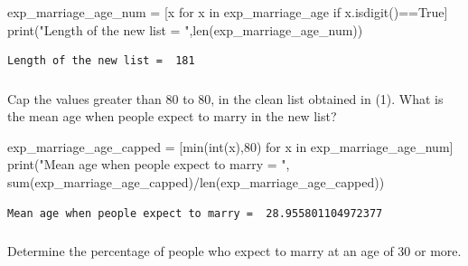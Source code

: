 \documentclass[
  letterpaper,
  DIV=11,
  numbers=noendperiod]{scrreprt}
\newenvironment{Shaded}{\begin{snugshade}}{\end{snugshade}}
\newcommand{\BuiltInTok}[1]{\textcolor[rgb]{0.00,0.23,0.31}{#1}}
\newcommand{\ControlFlowTok}[1]{\textcolor[rgb]{0.00,0.23,0.31}{#1}}
\newcommand{\DecValTok}[1]{\textcolor[rgb]{0.68,0.00,0.00}{#1}}
\newcommand{\KeywordTok}[1]{\textcolor[rgb]{0.00,0.23,0.31}{#1}}
\newcommand{\NormalTok}[1]{\textcolor[rgb]{0.00,0.23,0.31}{#1}}
\newcommand{\OperatorTok}[1]{\textcolor[rgb]{0.37,0.37,0.37}{#1}}
\newcommand{\StringTok}[1]{\textcolor[rgb]{0.13,0.47,0.30}{#1}}
\newcommand{\VariableTok}[1]{\textcolor[rgb]{0.07,0.07,0.07}{#1}}
\begin{document}
\begin{Shaded}
\begin{Highlighting}[]
\NormalTok{exp\_marriage\_age\_num }\OperatorTok{=}\NormalTok{ [x }\ControlFlowTok{for}\NormalTok{ x }\KeywordTok{in}\NormalTok{ exp\_marriage\_age }\ControlFlowTok{if}\NormalTok{ x.isdigit()}\OperatorTok{==}\VariableTok{True}\NormalTok{]}
\BuiltInTok{print}\NormalTok{(}\StringTok{"Length of the new list = "}\NormalTok{,}\BuiltInTok{len}\NormalTok{(exp\_marriage\_age\_num))}
\end{Highlighting}
\end{Shaded}

\begin{verbatim}
Length of the new list =  181
\end{verbatim}

\hypertarget{section-5}{%
\subsubsection{}\label{section-5}}

Cap the values greater than 80 to 80, in the clean list obtained in (1).
What is the mean age when people expect to marry in the new list?

\begin{Shaded}
\begin{Highlighting}[]
\NormalTok{exp\_marriage\_age\_capped }\OperatorTok{=}\NormalTok{ [}\BuiltInTok{min}\NormalTok{(}\BuiltInTok{int}\NormalTok{(x),}\DecValTok{80}\NormalTok{) }\ControlFlowTok{for}\NormalTok{ x }\KeywordTok{in}\NormalTok{ exp\_marriage\_age\_num]}
\BuiltInTok{print}\NormalTok{(}\StringTok{"Mean age when people expect to marry = "}\NormalTok{, }\BuiltInTok{sum}\NormalTok{(exp\_marriage\_age\_capped)}\OperatorTok{/}\BuiltInTok{len}\NormalTok{(exp\_marriage\_age\_capped))}
\end{Highlighting}
\end{Shaded}

\begin{verbatim}
Mean age when people expect to marry =  28.955801104972377
\end{verbatim}

\hypertarget{section-6}{%
\subsubsection{}\label{section-6}}

Determine the percentage of people who expect to marry at an age of 30
or more.
\end{document}
